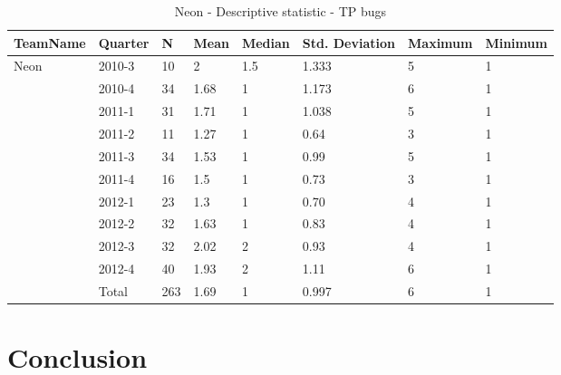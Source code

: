 \documentclass[UKenglish]{ifimaster}  %
\begin{document}
\begin{table}[!htbp]
\begin{tabular}{ | l | l | l | l | l | l | l | l | }
\hline
	TeamName & Quarter & N & Mean & Median & Std. Deviation & Maximum & Minimum \\ \hline
	Neon & 2010-3 & 10 & 2 & 1.5 & 1.333 & 5 & 1 \\ \hline
	 & 2010-4 & 34 & 1.68 & 1 & 1.173 & 6 & 1 \\ \hline
	 & 2011-1 & 31 & 1.71 & 1 & 1.038 & 5 & 1 \\ \hline
	 & 2011-2 & 11 & 1.27 & 1 & 0.64 & 3 & 1 \\ \hline
	 & 2011-3 & 34 & 1.53 & 1 & 0.99 & 5 & 1 \\ \hline
	 & 2011-4 & 16 & 1.5 & 1 & 0.73 & 3 & 1 \\ \hline
	 & 2012-1 & 23 & 1.3 & 1 & 0.70 & 4 & 1 \\ \hline
	 & 2012-2 & 32 & 1.63 & 1 & 0.83 & 4 & 1 \\ \hline
	 & 2012-3 & 32 & 2.02& 2 & 0.93& 4 & 1 \\ \hline
	 & 2012-4 & 40 & 1.93 & 2 & 1.11 & 6 & 1 \\ \hline
	 & Total & 263 & 1.69 & 1 & 0.997 & 6 & 1 \\ \hline
\end{tabular}
\caption{Neon - Descriptive statistic - TP bugs}
\end{table}


\chapter{Conclusion}
\label{ch:con}


\backmatter{}
\printbibliography
\end{document}
